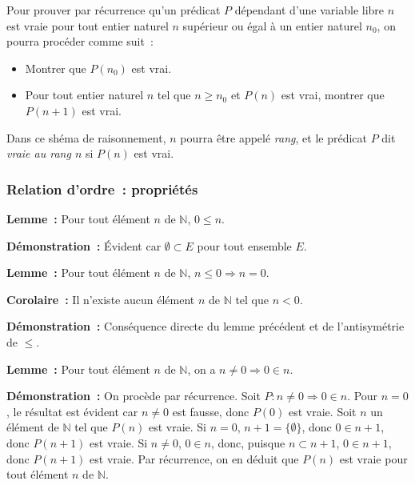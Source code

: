    \done 

\medskip

Pour prouver par récurrence qu'un prédicat $P$ dépendant d'une variable libre $n$ est vraie pour tout entier naturel $n$ supérieur ou égal à un entier naturel $n_0$, on pourra procéder comme suit : 
\begin{itemize}[nosep]
    \item Montrer que $P(n_0)$ est vrai.
    \item Pour tout entier naturel $n$ tel que $n \geq n_0$ et $P(n)$ est vrai, montrer que $P(n+1)$ est vrai.
\end{itemize}
Dans ce shéma de raisonnement, $n$ pourra être appelé \textit{rang}, et le prédicat $P$ dit \textit{vraie au rang $n$} si $P(n)$ est vrai.

\subsubsection{Relation d'ordre : propriétés}
\label{subsub:relOrdreProps}

\noindent\textbf{Lemme :} Pour tout élément $n$ de $\mathbb{N}$, $0 \leq n$.

\medskip

\noindent\textbf{Démonstration :} Évident car $\emptyset \subset E$ pour tout ensemble $E$. 

   \done 

\noindent\textbf{Lemme :} Pour tout élément $n$ de $\mathbb{N}$, $n \leq 0 \Rightarrow n = 0$.

\medskip

\noindent\textbf{Corolaire :} Il n'existe aucun élément $n$ de $\mathbb{N}$ tel que $n < 0$.

\medskip

\noindent\textbf{Démonstration :} Conséquence directe du lemme précédent et de l'antisymétrie de $\leq$. 

   \done 

\medskip

\noindent\textbf{Lemme :} Pour tout élément $n$ de $\mathbb{N}$, on a $n \neq 0 \Rightarrow 0 \in n$.

\medskip

\noindent\textbf{Démonstration :} 
    On procède par récurrence. 
    Soit $P: n \neq 0 \Rightarrow 0 \in n$.
    Pour $n = 0$, le résultat est évident car $n \neq 0$ est fausse, donc $P(0)$ est vraie. 
    Soit $n$ un élément de $\mathbb{N}$ tel que $P(n)$ est vraie. 
    Si $n = 0$, $n+1 = \lbrace \emptyset \rbrace$, donc $0 \in n+1$, donc $P(n+1)$ est vraie.
    Si $n \neq 0$, $0 \in n$, donc, puisque $n \subset n+1$, $0 \in n+1$, donc $P(n+1)$ est vraie.
    Par récurrence, on en déduit que $P(n)$ est vraie pour tout élément $n$ de $\mathbb{N}$.

